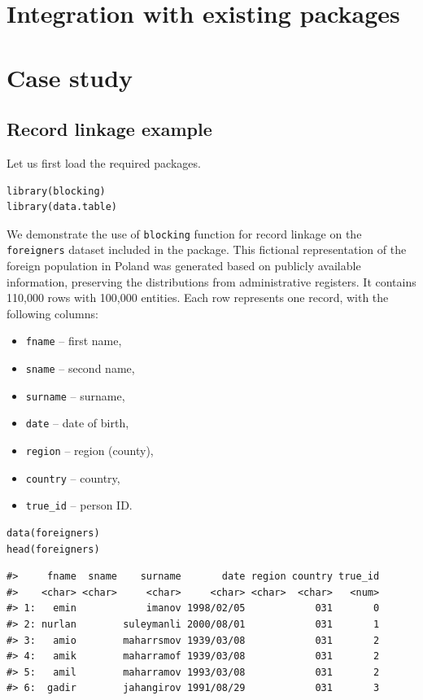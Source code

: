 \section{Integration with existing packages}\label{integration-with-existing-packages}

\section{Case study}\label{case-study}

\subsection{Record linkage example}\label{record-linkage-example}

Let us first load the required packages.

\begin{verbatim}
library(blocking)
library(data.table)
\end{verbatim}

We demonstrate the use of \texttt{blocking} function for record linkage on the \texttt{foreigners} dataset included in the package. This fictional representation of the foreign population in Poland was generated based on publicly available information, preserving the distributions from administrative registers. It contains 110,000 rows with 100,000 entities. Each row represents one record, with the following columns:

\begin{itemize}
\tightlist
\item
  \texttt{fname} -- first name,
\item
  \texttt{sname} -- second name,
\item
  \texttt{surname} -- surname,
\item
  \texttt{date} -- date of birth,
\item
  \texttt{region} -- region (county),
\item
  \texttt{country} -- country,
\item
  \texttt{true\_id} -- person ID.
\end{itemize}

\begin{verbatim}
data(foreigners)
head(foreigners)
\end{verbatim}

\begin{verbatim}
#>     fname  sname    surname       date region country true_id
#>    <char> <char>     <char>     <char> <char>  <char>   <num>
#> 1:   emin            imanov 1998/02/05            031       0
#> 2: nurlan        suleymanli 2000/08/01            031       1
#> 3:   amio        maharrsmov 1939/03/08            031       2
#> 4:   amik        maharramof 1939/03/08            031       2
#> 5:   amil        maharramov 1993/03/08            031       2
#> 6:  gadir        jahangirov 1991/08/29            031       3
\end{verbatim}

